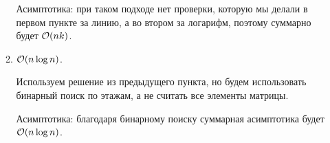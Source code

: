 \begin{enumerate}
\begin{enumerate}
\begin{solution}
            Асимптотика:
            при таком подходе нет проверки, которую мы делали в первом пункте за линию, а во втором за логарифм, поэтому суммарно будет $\mathcal{O}(nk)$.
        \end{solution}
        \item $\mathcal{O}(n \log{n})$.
        \begin{solution}
            Используем решение из предыдущего пункта, но будем использовать бинарный поиск по этажам, а не считать все элементы матрицы.

            Асимптотика:
            благодаря бинарному поиску суммарная асимптотика будет $\mathcal{O}(n\log n)$.
        \end{solution}
    \end{enumerate}
\end{enumerate}


    